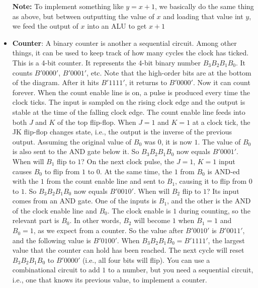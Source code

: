 \documentclass{report}
\begin{document}
\begin{itemize}
                \bigbreak \noindent 
                \textbf{Note:} To implement something like $y=x+1$, we basically do the same thing as above, but between outputting the value of $x$ and loading that value int $y$, we feed the output of $x$ into an ALU to get $x+1 $

            \item \textbf{Counter}: A binary counter is another a sequential circuit. Among other things, it can be used to keep track of how many cycles the clock has ticked.
                \bigbreak \noindent 
                This is a 4-bit counter. It represents the 4-bit binary number $B_{3}B_{2}B_{1}B_{0}$.  
                \bigbreak \noindent 
                \bigbreak \noindent 
                It counts $B'0000'$, $B'0001'$, etc. Note that the high-order bits are at the bottom of the diagram.  
                \bigbreak \noindent 
                After it hits $B'1111'$, it returns to $B'0000'$. Now it can count forever.
                \bigbreak \noindent 
                When the count enable line is on, a pulse is produced every time the clock ticks.
                \bigbreak \noindent 
                The input is sampled on the rising clock edge and the output is stable at the time of the falling clock edge.
                \bigbreak \noindent 
                The count enable line feeds into both $J$ and $K$ of the top flip-flop.  
                \bigbreak \noindent 
                When $J = 1$ and $K = 1$ at a clock tick, the JK flip-flop changes state, i.e., the output is the inverse of the previous output. Assuming the original value of $B_{0}$ was $0$, it is now $1$. The value of $B_{0}$ is also sent to the AND gate below it. So $B_{3}B_{2}B_{1}B_{0}$ now equals $B'0001'$.
                \bigbreak \noindent 
                When will $B_{1}$ flip to $1$?  On the next clock pulse, the $J = 1$, $K = 1$ input causes $B_{0}$ to flip from $1$ to $0$. At the same time, the $1$ from $B_{0}$ is AND-ed with the $1$ from the count enable line and sent to $B_{1}$, causing it to flip from $0$ to $1$. So $B_{3}B_{2}B_{1}B_{0}$ now equals $B'0010'$.
                \bigbreak \noindent 
                When will $B_{2}$ flip to $1$?  Its input comes from an AND gate. One of the inputs is $B_{1}$, and the other is the AND of the clock enable line and $B_{0}$.  
                \bigbreak \noindent 
                The clock enable is $1$ during counting, so the relevant part is $B_{0}$.  
                \bigbreak \noindent 
                In other words, $B_{2}$ will become $1$ when $B_{1} = 1$ and $B_{0} = 1$, as we expect from a counter. So the value after $B'0010'$ is $B'0011'$, and the following value is $B'0100'$.
                \bigbreak \noindent 
                When $B_{3}B_{2}B_{1}B_{0} = B'1111'$, the largest value that the counter can hold has been reached.  
                \bigbreak \noindent 
                The next cycle will reset $B_{3}B_{2}B_{1}B_{0}$ to $B'0000'$ (i.e., all four bits will flip).  
                \bigbreak \noindent 
                You can use a combinational circuit to add $1$ to a number, but you need a sequential circuit, i.e., one that knows its previous value, to implement a counter.


\end{itemize}
\end{document}
